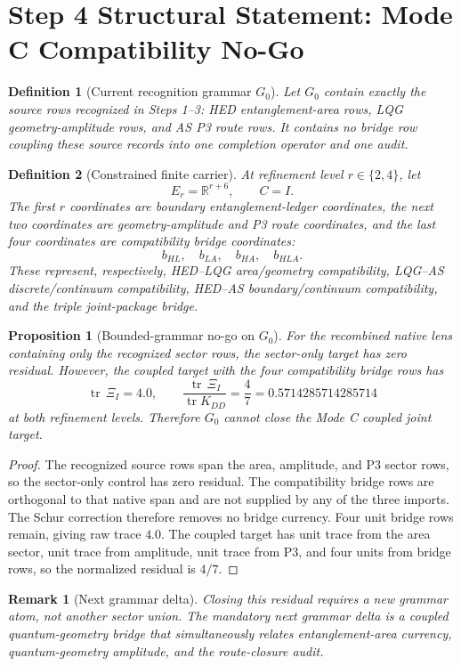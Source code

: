 \documentclass[11pt]{article}
\newtheorem{definition}{Definition}
\newtheorem{proposition}{Proposition}
\newtheorem{remark}{Remark}
\DeclareMathOperator{\tr}{tr}
\begin{document}
\section*{Step 4 Structural Statement: Mode C Compatibility No-Go}

\begin{definition}[Current recognition grammar \(G_0\)]
Let \(G_0\) contain exactly the source rows recognized in Steps 1--3:
HED entanglement-area rows, LQG geometry-amplitude rows, and AS P3 route rows.
It contains no bridge row coupling these source records into one completion
operator and one audit.
\end{definition}

\begin{definition}[Constrained finite carrier]
At refinement level \(r\in\{2,4\}\), let
\[
  E_r=\mathbb{R}^{r+6},\qquad C=I.
\]
The first \(r\) coordinates are boundary entanglement-ledger coordinates, the
next two coordinates are geometry-amplitude and P3 route coordinates, and the
last four coordinates are compatibility bridge coordinates:
\[
  b_{HL},\quad b_{LA},\quad b_{HA},\quad b_{HLA}.
\]
These represent, respectively, HED--LQG area/geometry compatibility,
LQG--AS discrete/continuum compatibility, HED--AS boundary/continuum
compatibility, and the triple joint-package bridge.
\end{definition}

\begin{proposition}[Bounded-grammar no-go on \(G_0\)]
For the recombined native lens containing only the recognized sector rows, the
sector-only target has zero residual.  However, the coupled target with the
four compatibility bridge rows has
\[
  \tr\,\Xi_I=4.0,\qquad
  \frac{\tr\,\Xi_I}{\tr K_{DD}}=\frac{4}{7}=0.5714285714285714
\]
at both refinement levels.  Therefore \(G_0\) cannot close the Mode C coupled
joint target.
\end{proposition}

\begin{proof}
The recognized source rows span the area, amplitude, and P3 sector rows, so
the sector-only control has zero residual.  The compatibility bridge rows are
orthogonal to that native span and are not supplied by any of the three
imports.  The Schur correction therefore removes no bridge currency.  Four
unit bridge rows remain, giving raw trace \(4.0\).  The coupled target has
unit trace from the area sector, unit trace from amplitude, unit trace from
P3, and four units from bridge rows, so the normalized residual is \(4/7\).
\end{proof}

\begin{remark}[Next grammar delta]
Closing this residual requires a new grammar atom, not another sector union.
The mandatory next grammar delta is a coupled quantum-geometry bridge that
simultaneously relates entanglement-area currency, quantum-geometry amplitude,
and the route-closure audit.
\end{remark}
\end{document}
